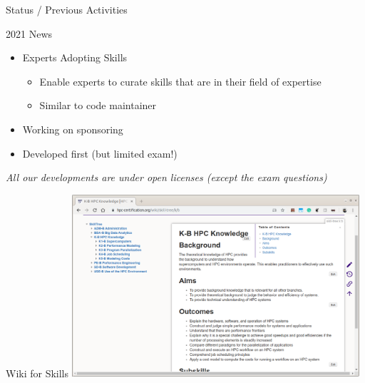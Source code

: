 \documentclass[compress,aspectratio=169]{beamer}
\begin{document}
\begin{frame}{Status / Previous Activities}
\vspace*{-1cm}

\begin{block}{2021 News}
\begin{itemize}
\item Experts Adopting Skills
\begin{itemize}
  \item Enable experts to curate skills that are in their field of expertise
  \item Similar to code maintainer
\end{itemize}
\item Working on sponsoring 
\item Developed first (but limited exam!)
\end{itemize}
\end{block}

\medskip

\textit{All our developments are under open licenses (except the exam questions)}
\end{frame}


\begin{frame}{Wiki for Skills}
  \includegraphics[width=0.8\textwidth]{www}
\end{frame}
\end{document}
